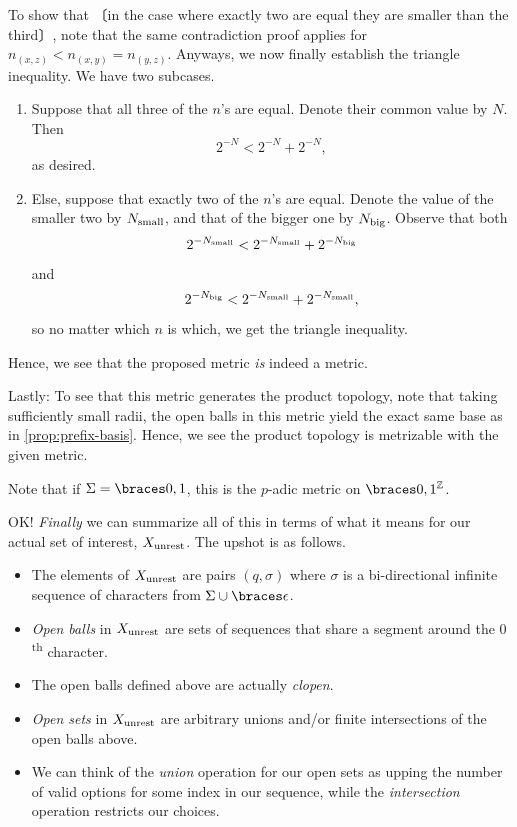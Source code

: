 \documentclass{fkpaper}
\newcommand{\np}[1]{\hspace{-.55em}〔#1〕\hspace{-.55em}}
\begin{document}
\begin{multicols}{2}
\begin{sproof}
    To show that \np{in the case where exactly two are equal they are
      smaller than the third}, note that the same contradiction proof
    applies for $n_{(x,z)} < n_{(x,y)} = n_{(y,z)}$. Anyways, we now
    finally establish the triangle inequality. We have two subcases.
    \begin{enumerate}
      \item Suppose that all three of the $n$'s are equal. Denote their
        common value by $N$. Then
        \[
        2^{-N} < 2^{-N} + 2^{-N},
        \]
        as desired.
      \item Else, suppose that exactly two of the $n$'s are equal.
        Denote the value of the smaller two by $N_{\rm small}$, and that
        of the bigger one by $N_{\rm big}$. Observe that both
        \[
        2^{-N_{\rm small}} < 2^{-N_{\rm small}} + 2^{-N_{\rm big}}
        \]
        and
        \[
        2^{-N_{\rm big}} < 2^{-N_{\rm small}} + 2^{-N_{\rm small}},
        \]
        so no matter which $n$ is which, we get the triangle inequality.
    \end{enumerate}
    Hence, we see that the proposed metric \emph{is} indeed a metric.

    Lastly: To see that this metric generates the product topology, note
    that taking sufficiently small radii, the open balls in this metric
    yield the exact same base as in \cref{prop:prefix-basis}. Hence, we
    see the product topology is metrizable with the given metric.
  \end{sproof}
  \begin{remark}
    Note that if $\Sigma = \set{0,1}$, this is the $p$-adic metric on
    $\set{0,1}^{\ZZ}$.
  \end{remark}
  OK! \emph{Finally} we can summarize all of this in terms of what it
  means for our actual set of interest, $X_{\rm unrest}$. The upshot
  is as follows.
  \begin{itemize}
    \item The elements of $X_{\rm unrest}$ are pairs $(q, \sigma)$ where
      $\sigma$ is a bi-directional infinite sequence of characters from
      $\Sigma \cup \set{\epsilon}$.
    \item \emph{Open balls} in $X_{\rm unrest}$ are sets of sequences
      that share a segment around the $0$\textsuperscript{th}
      character.
    \item The open balls defined above are actually \emph{clopen}.
    \item \emph{Open sets} in $X_{\rm unrest}$ are arbitrary unions
      and/or finite intersections of the open balls above.
    \item We can think of the \emph{union} operation for our open sets
      as upping the number of valid options for some index in our
      sequence, while the \emph{intersection} operation restricts our
      choices.
  \end{itemize}



\end{multicols}
\end{document}
